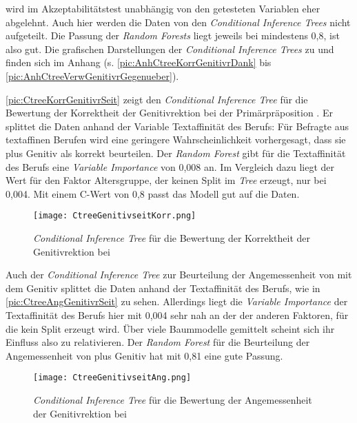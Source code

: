  wird im Akzeptabilitätstest unabhängig von den getesteten Variablen eher abgelehnt. 
Auch hier werden die Daten von den \textit{Conditional Inference Trees} nicht aufgeteilt. 
Die Passung der \textit{Random Forests} liegt jeweils bei mindestens 0,8, ist also gut. 
Die grafischen Darstellungen der \textit{Conditional Inference Trees} zu \dank{} und \gegenueber{} finden sich im Anhang (s. \autoref{pic:AnhCtreeKorrGenitivrDank} bis \autoref{pic:AnhCtreeVerwGenitivrGegenueber}). 

\autoref{pic:CtreeKorrGenitivrSeit} zeigt den \textit{Conditional Inference Tree} für die Bewertung der Korrektheit der Genitivrektion bei der Primärpräposition .
Er splittet die Daten anhand der Variable \glqq Textaffinität des Berufs\grqq:
Für Befragte aus textaffinen Berufen wird eine geringere Wahrscheinlichkeit vorhergesagt, dass sie  plus Genitiv als korrekt beurteilen. 
Der \textit{Random Forest} gibt für die Textaffinität des Berufs eine \textit{Variable Importance} von 0,008 an. 
Im Vergleich dazu liegt der Wert für den Faktor \glqq Altersgruppe\grqq, der keinen Split im \textit{Tree} erzeugt, nur bei 0,004.
Mit einem C-Wert von 0,8 passt das Modell gut auf die Daten. 
\begin{figure}
\centering
\texttt{[image: CtreeGenitivseitKorr.png]}
\caption{\textit{Conditional Inference Tree }für die Bewertung der Korrektheit der Genitivrektion bei }
\label{pic:CtreeKorrGenitivrSeit}
\end{figure}

Auch der \textit{Conditional Inference Tree} zur Beurteilung der Angemessenheit von  mit dem Genitiv splittet die Daten anhand der Textaffinität des Berufs, wie in \autoref{pic:CtreeAngGenitivrSeit} zu sehen. 
Allerdings liegt die \textit{Variable Importance} der Textaffinität des Berufs hier mit 0,004 sehr nah an der der anderen Faktoren, für die kein Split erzeugt wird. 
Über viele Baummodelle gemittelt scheint sich ihr Einfluss also zu relativieren. 
Der \textit{Random Forest} für die Beurteilung der Angemessenheit von  plus Genitiv hat mit 0,81 eine gute Passung. 
\begin{figure}
\centering
\texttt{[image: CtreeGenitivseitAng.png]}
\caption{\textit{Conditional Inference Tree} für die Bewertung der Angemessenheit der Genitivrektion bei }
\label{pic:CtreeAngGenitivrSeit}
\end{figure}

